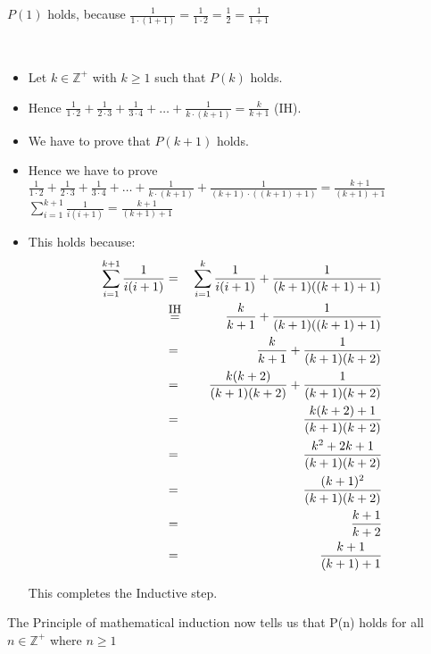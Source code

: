 \documentclass[a4paper]{article}
\newcommand{\ZZp}{\ensuremath{\mathbb{Z}^{+}}}
\newcommand{\templtag}[1]{\marginpar{\fbox{#1}}}
\begin{document}
{\begin{description}
\medskip %
$P(1)$ holds, \templtag{4}%
because $\frac{1}{1 \cdot (1 + 1)} = \frac{1}{1 \cdot 2} = \frac{1}{2} = \frac{1}{1 + 1}$
\item[Inductive step]~\templtag{5}\\

\medskip
\begin{itemize}
\item
Let \templtag{6}%
$k\in\ZZp$ with $k\geq 1$ such that $P(k)$ holds.

\medskip
\item
Hence \templtag{7}%
$\frac{1}{1\cdot 2}+\frac{1}{2\cdot 3}+\frac{1}{3\cdot 4}+\dots+\frac{1}{k \cdot (k+1)} = \frac{k}{k + 1}$ (\mbox{IH}).

\medskip
\item
We \templtag{8}%
have to prove that $P(k + 1)$ holds.

\medskip
\item
Hence \templtag{9}%
we have to prove
$\frac{1}{1\cdot 2}+\frac{1}{2\cdot 3}+\frac{1}{3\cdot 4}+\dots+\frac{1}{k \cdot (k+1)} + \frac{1}{(k+1) \cdot ((k + 1)+1)} = \frac{k + 1}{(k + 1) + 1}$
$\sum_{i=1}^{k + 1} \frac{1}{i(i+1)}  = \frac{k + 1}{(k + 1) + 1}$

\medskip
\item
This \templtag{10}%
holds because:
\begin{eqnarray*}
\sum_{i=1}^{k + 1} \frac{1}{i(i+1)}
&=& \sum_{i=1}^{k} \frac{1}{i(i+1)} + \frac{1}{(k + 1)((k + 1) + 1)}  \\
&\stackrel{\small\mbox{IH}}{=} & \frac{k}{k + 1} + \frac{1}{(k+1)((k + 1) + 1)} \\
&=    & \frac{k}{k + 1} + \frac{1}{(k+1)(k + 2)} \\
&=    & \frac{k(k + 2)}{(k + 1)(k + 2)} + \frac{1}{(k+1)(k + 2)} \\
&=    & \frac{k(k + 2) + 1}{(k + 1)(k + 2)} \\
&=    & \frac{k^2 + 2k + 1}{(k + 1)(k + 2)} \\
&=    & \frac{(k + 1)^2}{(k + 1)(k + 2)} \\
&=    & \frac{k + 1}{k + 2} \\
&=    & \frac{k + 1}{(k + 1) + 1}
\end{eqnarray*}

\medskip
This \templtag{11}%
completes the Inductive step.
\end{itemize}
\end{description}

\medskip
The \templtag{12}%
Principle of mathematical induction now tells us that P(n) holds for all $n \in \mathbb{Z}^+$ where $n \geq 1$
}
\end{document}
